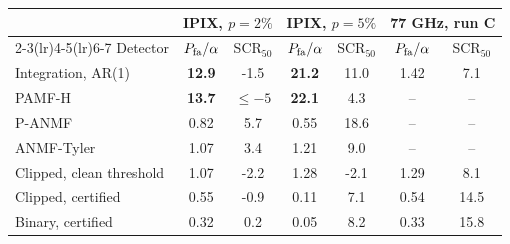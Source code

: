 \begin{tabular}{lcccccc}
\toprule
 & \multicolumn{2}{c}{IPIX, $p=2\%$} & \multicolumn{2}{c}{IPIX, $p=5\%$} & \multicolumn{2}{c}{77 GHz, run C}\\
\cmidrule(lr){2-3}\cmidrule(lr){4-5}\cmidrule(lr){6-7}
 Detector & $P_{\rm fa}/\alpha$ & SCR$_{50}$ & $P_{\rm fa}/\alpha$ & SCR$_{50}$ & $P_{\rm fa}/\alpha$ & SCR$_{50}$\\
\midrule
Integration, AR(1) & \textbf{12.9} & -1.5 & \textbf{21.2} & 11.0 & 1.42 & 7.1\\
PAMF-H & \textbf{13.7} & $\le-5$ & \textbf{22.1} & 4.3 & -- & --\\
P-ANMF & 0.82 & 5.7 & 0.55 & 18.6 & -- & --\\
ANMF-Tyler & 1.07 & 3.4 & 1.21 & 9.0 & -- & --\\
Clipped, clean threshold & 1.07 & -2.2 & 1.28 & -2.1 & 1.29 & 8.1\\
Clipped, certified & 0.55 & -0.9 & 0.11 & 7.1 & 0.54 & 14.5\\
Binary, certified & 0.32 & 0.2 & 0.05 & 8.2 & 0.33 & 15.8\\
\bottomrule
\end{tabular}
